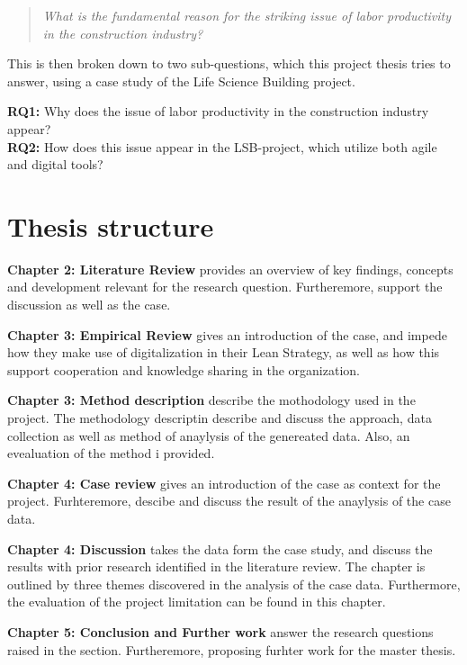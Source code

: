 \begin{quote}
    \textit{What is the fundamental reason for the striking issue of labor productivity in the construction industry?}
\end{quote}
This is then broken down to two sub-questions, which this project thesis tries to answer, using a case study of the Life Science Building project.

{\noindent \bf RQ1:} Why does the issue of labor productivity in the construction industry appear? \\
{\noindent \bf RQ2:} How does this issue appear in the LSB-project, which utilize both agile and digital tools?

\section{Thesis structure} \label{sec:thesis}

{\noindent \bf Chapter 2: Literature Review} provides an overview of key findings, concepts and development relevant for the research question. Furtheremore, support the discussion as well as the case. 

{\noindent \bf Chapter 3: Empirical Review} gives an introduction of the case, and impede how they make use of digitalization in their Lean Strategy, as well as how this support cooperation and knowledge sharing in the organization.

{\noindent \bf Chapter 3: Method description} describe the mothodology used in the project. The methodology descriptin describe and discuss the approach, data collection as well as method of anaylysis of the genereated data. Also, an evealuation of the method i provided.

{\noindent \bf Chapter 4: Case review} gives an introduction of the case as context for the project. Furhteremore, descibe and discuss the result of the anaylysis of the case data. 

{\noindent \bf Chapter 4: Discussion} takes the data form the case study, and discuss the results with prior research identified in the literature review. The chapter is outlined by three themes discovered in the analysis of the case data. Furthermore, the evaluation of the project limitation can be found in this chapter.

{\noindent \bf Chapter 5: Conclusion and Further work} answer the research questions raised in the  section. Furtheremore, proposing furhter work for the master thesis.


\cleardoublepage